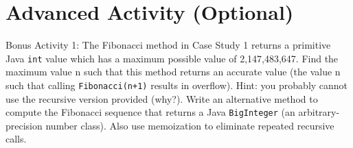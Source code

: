 \documentclass[12pt]{scrartcl}
\begin{document}
\section*{Advanced Activity (Optional)}

Bonus Activity 1: The Fibonacci method in Case Study 1 returns a 
primitive Java \texttt{int} value which has a maximum 
possible value of 2,147,483,647.  Find the maximum value n such 
that this method returns an accurate value (the value n such that 
calling \texttt{Fibonacci(n+1)} results in overflow).  
Hint: you probably cannot use the recursive version provided 
(why?).  Write an alternative method to compute the Fibonacci 
sequence that returns a Java \texttt{BigInteger} (an 
arbitrary-precision number class).  Also use memoization to 
eliminate repeated recursive calls.
\end{document}
